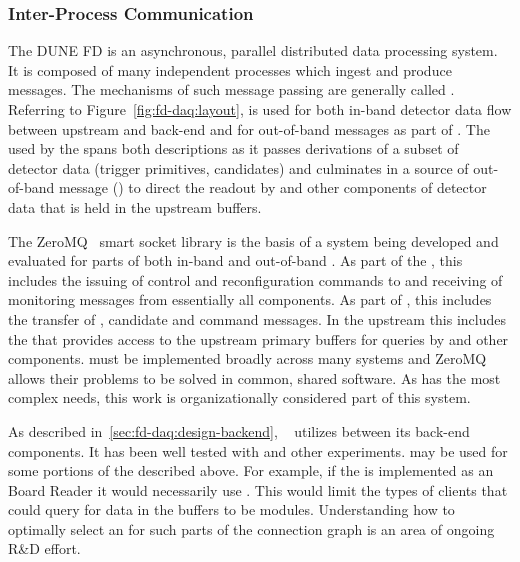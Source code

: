 \subsubsection{Inter-Process Communication}
\label{sec:daq:design-ipc}

The DUNE FD  is an asynchronous, parallel distributed data processing system. 
It is composed of many independent processes which ingest and produce messages. 
The mechanisms of such message passing are generally called . 
Referring to Figure~\ref{fig:fd-daq:layout},  is used for both in-band detector data flow between upstream  and back-end  and for out-of-band messages as part of .  The  used by the  spans both descriptions as it passes derivations of a subset of detector data (trigger primitives, candidates) and culminates in a source of out-of-band message () to direct the readout by  and other components of detector data that is held in the upstream  buffers.

The ZeroMQ~\cite{zeromq} smart socket library is 
the basis of a system being developed and evaluated for parts of both in-band and out-of-band . 
As part of the , this includes the issuing of control and reconfiguration commands to and receiving of monitoring messages from essentially all  components. 
As part of , this includes the transfer of , candidate and command messages. 
In the upstream  this includes the  that  provides access to the upstream  primary buffers for queries by  and other components. 
  must be implemented broadly across many  systems and ZeroMQ allows their problems to be solved in common, shared software.  As  has the most complex   needs, this work is organizationally considered part of this system.

As described in~\ref{sec:fd-daq:design-backend}, ~\cite{artdaq} utilizes   between its back-end components. 
It has been well tested with  and other experiments. 
 may be used for some portions of the   described above. 
For example, if the  is implemented as an  Board Reader it would necessarily use   . 
This would limit the types of clients that could query for data in the buffers to be  modules. 
Understanding how to optimally select an   for such parts of the  connection graph is an area of ongoing R\&D effort.

